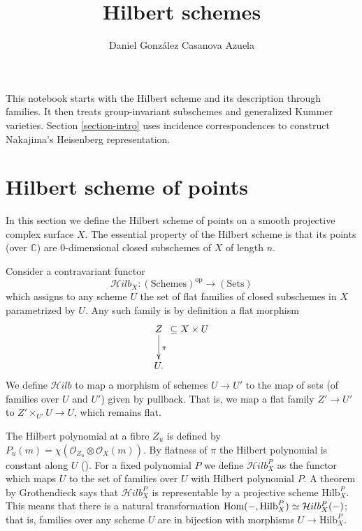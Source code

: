 
\usepackage{graphicx}
\usepackage{url}



\title{Hilbert schemes}
\author{Daniel González Casanova Azuela}
\maketitle
{}
\label{section-phantom}

\noindent
This notebook starts with the Hilbert
scheme and its description through families.
It then treats group-invariant subschemes
and generalized Kummer varieties.
Section \ref{section-intro} uses incidence
correspondences to construct Nakajima's
Heisenberg representation.

\tableofcontents

\section{Hilbert scheme of points}
\label{section-hilbert-scheme}

\noindent
In this section we define
the Hilbert scheme of points
on a smooth projective complex surface $X$.
The essential property of the Hilbert scheme
is that its points (over $\mathbb{C}$)
are 0-dimensional closed subschemes of $X$
of length $n$.

\medskip\noindent
Consider a contravariant functor
$$
\mathcal{H}ilb_X:(\text{Schemes})^{\text{op}}\to (\text{Sets})
$$
which assigns to any scheme $U$ the set of
flat families
of closed subschemes in $X$ parametrized by
$U$.
Any such family is by definition a flat
morphism
$$
\xymatrix@C=.1em{
Z \ar[d]^\pi&\subseteq X \times U\\
U.
}
$$
We define $\mathcal{H}ilb$ to map a morphism
of schemes
$U \to U'$ to the map of sets (of families
over $U$ and $U'$) given
by pullback. That is, we map a flat family
$Z'\to U'$
to $Z'\times_{U'}U \to U$, which remains
flat.

The Hilbert polynomial at a fibre $Z_u$ is
defined by
$P_u(m)=\chi(\mathcal{O}_{Z_u}\otimes
\mathcal{O}_X(m))$.
By flatness of $\pi$ the Hilbert polynomial
is constant along $U$
(\cite[Part III, Theorem 9.9]{har}).
For a fixed polynomial $P$
we define $\mathcal{H}ilb^P_X$ as the
functor which maps $U$
to the set of families over $U$ with Hilbert
polynomial $P$.
A theorem by Grothendieck says that
$\mathcal{H}ilb^P_X$ is representable
by a projective scheme $\text{Hilb}^P_X$.
This means that there is a natural
transformation
$\mathop{\mathrm{Hom}}\nolimits(-,\text{Hilb}^P_X) \simeq
\mathcal{H}ilb^P_X(-)$;
that is, families over any scheme $U$ are in
bijection with
morphisms $U \to \text{Hilb}^P_X$.

